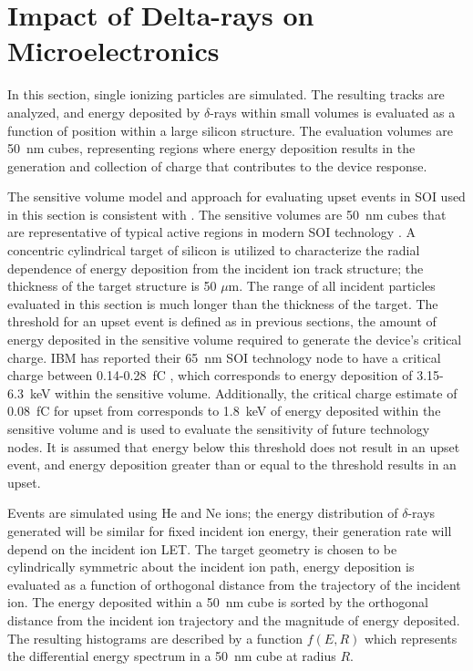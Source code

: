\section{Impact of Delta-rays on Microelectronics} %
\label{sec:impact_of_delta_rays_on_microelectronics}
In this section, single ionizing particles are simulated.
The resulting tracks are analyzed, and energy deposited by $\delta$-rays within small volumes is evaluated as a function of position within a large silicon structure.
The evaluation volumes are 50~nm cubes, representing regions where energy deposition results in the generation and collection of charge that contributes to the device response.

The sensitive volume model and approach for evaluating upset events in SOI used in this section is consistent with \cite{King:2010jg,King:2012cb,Haran:2008ve}.
The sensitive volumes are 50~nm cubes that are representative of typical active regions in modern SOI technology \cite{Haran:2008ve}. 
A concentric cylindrical target of silicon is utilized to characterize the radial dependence of energy deposition from the incident ion track structure; the thickness of the target structure is 50 $\mu$m. 
The range of all incident particles evaluated in this section is much longer than the thickness of the target. 
The threshold for an upset event is defined as in previous sections, the amount of energy deposited in the sensitive volume required to generate the device’s critical charge.
IBM has reported their 65~nm SOI technology node to have a critical charge between 0.14-0.28~fC \cite{Rodbell:2007vl}, which corresponds to energy deposition of 3.15-6.3~keV within the sensitive volume. 
Additionally, the critical charge estimate of 0.08~fC for upset from \cite{King:2010jg} corresponds to 1.8~keV of energy deposited within the sensitive volume and is used to evaluate the sensitivity of future technology nodes. 
It is assumed that energy below this threshold does not result in an upset event, and energy deposition greater than or equal to the threshold results in an upset.

Events are simulated using He and Ne ions; the energy 
distribution of $\delta$-rays generated will be similar for fixed  
incident ion energy, their generation rate will depend on the incident ion
LET.
The target geometry is chosen to be cylindrically symmetric about the incident ion path, energy deposition is evaluated as a function of orthogonal distance from the trajectory of the incident ion. 
The energy deposited within a 50~nm cube is sorted by the orthogonal distance from the incident ion trajectory and the magnitude of energy deposited.
The resulting histograms are described by a function $f(E,R)$ which represents the differential energy spectrum in a 50~nm cube at radius $R$.

